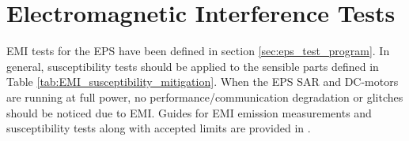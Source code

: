 \section{Electromagnetic Interference Tests}
\ac{EMI} tests for the \ac{EPS} have been defined in section \ref{sec:eps_test_program}. In general, susceptibility tests should be applied to the sensible parts defined in Table \ref{tab:EMI_susceptibility_mitigation}. When the \ac{EPS} \ac{SAR} and DC-motors are running at full power, no performance/communication degradation or glitches should be noticed due to \ac{EMI}. Guides for \ac{EMI} emission measurements and susceptibility tests along with accepted limits are provided in \cite{ECSS_EMC}.